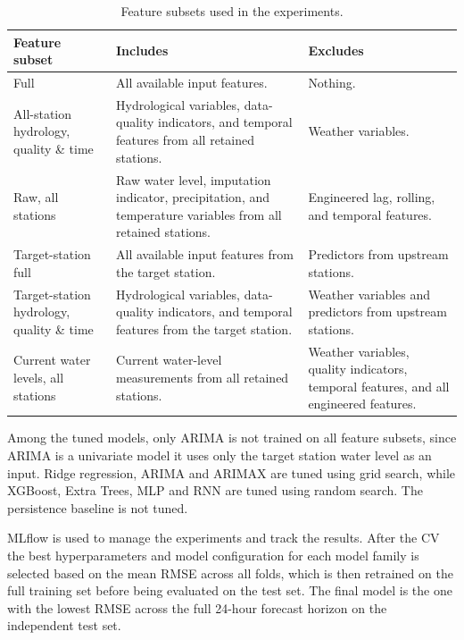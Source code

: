 \begin{table}[htbp]
    \centering
    \begin{tabularx}{\textwidth}{p{} X X}
        \toprule
        \textbf{Feature subset} & \textbf{Includes} & \textbf{Excludes} \\
        \midrule
        Full
        & All available input features.
        & Nothing. \\
        \addlinespace
        All-station hydrology, quality \& time
        & Hydrological variables, data-quality indicators, and temporal features from all retained stations.
        & Weather variables. \\
        \addlinespace
        Raw, all stations
        & Raw water level, imputation indicator, precipitation, and temperature variables from all retained stations.
        & Engineered lag, rolling, and temporal features. \\
        \addlinespace
        Target-station full
        & All available input features from the target station.
        & Predictors from upstream stations. \\
        \addlinespace
        Target-station hydrology, quality \& time
        & Hydrological variables, data-quality indicators, and temporal features from the target station.
        & Weather variables and predictors from upstream stations. \\
        \addlinespace
        Current water levels, all stations
        & Current water-level measurements from all retained stations.
        & Weather variables, quality indicators, temporal features, and all engineered features. \\
        \bottomrule
    \end{tabularx}
    \caption{Feature subsets used in the experiments.}
    \label{tab:feature-subsets}
\end{table}

Among the tuned models, only \ac{ARIMA} is not trained on all feature subsets, since \ac{ARIMA} is a univariate model it uses only the target station water level as an input. Ridge regression, \ac{ARIMA} and \ac{ARIMAX} are tuned using grid search, while XGBoost, Extra Trees, \ac{MLP} and \ac{RNN} are tuned using random search. The persistence baseline is not tuned. \cite{bergstraRandomSearchHyperParameter2012, feurerHyperparameterOptimization2019}

MLflow is used to manage the experiments and track the results. After the \ac{CV} the best hyperparameters and model configuration for each model family is selected based on the mean \ac{RMSE} across all folds, which is then retrained on the full training set before being evaluated on the test set. The final model is the one with the lowest \ac{RMSE} across the full 24-hour forecast horizon on the independent test set.


